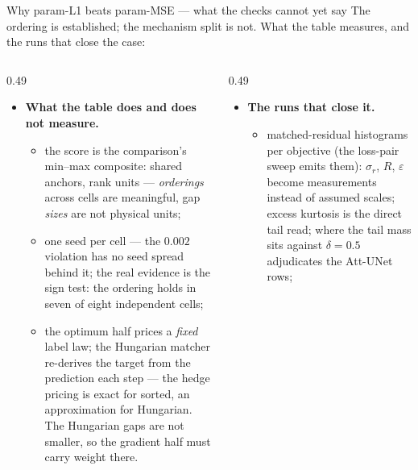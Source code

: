 \begin{frame}{Why param-L1 beats param-MSE --- what the checks cannot yet say}
  \small
  The ordering is established; the mechanism split is not. What the table
  measures, and the runs that close the case:
  \vfill
  \begin{columns}[c]
    \begin{column}{0.49\textwidth}
      \small
      \begin{itemize}
        \item \textbf{What the table does and does not measure.}
        \begin{itemize}\setlength{\itemsep}{4pt}
        \item {\scriptsize the score is the comparison's min--max composite:
              shared anchors, rank units --- \emph{orderings} across cells
              are meaningful, gap \emph{sizes} are not physical units;}
        \item {\scriptsize one seed per cell --- the $0.002$ violation has no
              seed spread behind it; the real evidence is the sign test: the
              ordering holds in seven of eight independent cells;}
        \item {\scriptsize the optimum half prices a \emph{fixed} label law;
              the Hungarian matcher re-derives the target from the prediction
              each step --- the hedge pricing is exact for sorted,
              an approximation for Hungarian. The Hungarian gaps are not
              smaller, so the gradient half must carry
              weight there.}
        \end{itemize}
      \end{itemize}
    \end{column}
    \begin{column}{0.49\textwidth}
      \small
      \begin{itemize}
        \item \textbf{The runs that close it.}
        \begin{itemize}\setlength{\itemsep}{4pt}
        \item {\scriptsize matched-residual histograms per objective (the
              loss-pair sweep emits them): $\sigma_r$, $R$, $\varepsilon$
              become measurements instead of assumed scales;
              excess kurtosis is the direct tail read; where the tail mass
              sits against $\delta = 0.5$ adjudicates the Att-UNet rows;}

\end{itemize}
\end{itemize}
\end{column}
\end{columns}
\end{frame}
